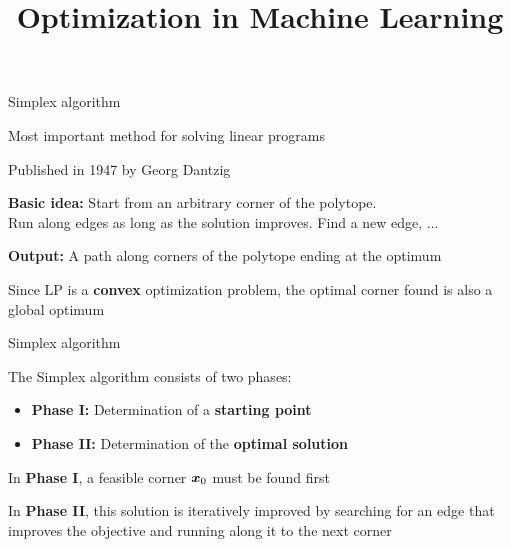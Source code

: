 \documentclass[11pt,compress,t,notes=noshow, xcolor=table]{beamer}
\title{Optimization in Machine Learning}
\begin{document}

\begin{framei}[sep=s, fs=small]{Simplex algorithm}
\item Most important method for solving linear programs
\item Published in 1947 by Georg Dantzig
\vfill
\item[] \textbf{Basic idea:} Start from an arbitrary corner of the polytope.\\
Run along edges as long as the solution improves. Find a new edge, ...
\item[] \textbf{Output:} A path along corners of the polytope ending at the optimum
\vfill
\item Since LP is a \textbf{convex} optimization problem, the optimal corner found is also a global optimum
\end{framei}


\begin{framei}[sep=L]{Simplex algorithm}
\item The Simplex algorithm consists of two phases:
\begin{itemize}
\item \textbf{Phase I:} Determination of a \textbf{starting point}
\item \textbf{Phase II:} Determination of the \textbf{optimal solution}
\end{itemize}
\item In \textbf{Phase I}, a feasible corner $\bm{x}_0$ must be found first
\item In \textbf{Phase II}, this solution is iteratively improved by searching for an edge that improves the objective and running along it to the next corner
\end{framei}
\end{document}
